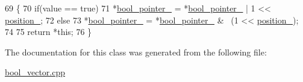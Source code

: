 \begin{DoxyCode}
69                             \{
70                                 \textcolor{keywordflow}{if}(value == \textcolor{keyword}{true})
71                                     *\hyperlink{classVector_3_01bool_01_4_1_1BoolReference_ad9fc66c2a80d7351e5829e321c4d46f0}{bool\_pointer\_} = *\hyperlink{classVector_3_01bool_01_4_1_1BoolReference_ad9fc66c2a80d7351e5829e321c4d46f0}{bool\_pointer\_} | 1 << 
      \hyperlink{classVector_3_01bool_01_4_1_1BoolReference_a88f229e6c448c4e7f34381247eb7f2b8}{position\_};
72                                 \textcolor{keywordflow}{else}
73                                     *\hyperlink{classVector_3_01bool_01_4_1_1BoolReference_ad9fc66c2a80d7351e5829e321c4d46f0}{bool\_pointer\_} = *\hyperlink{classVector_3_01bool_01_4_1_1BoolReference_ad9fc66c2a80d7351e5829e321c4d46f0}{bool\_pointer\_} & ~(1 << 
      \hyperlink{classVector_3_01bool_01_4_1_1BoolReference_a88f229e6c448c4e7f34381247eb7f2b8}{position\_});
74 
75                                 \textcolor{keywordflow}{return} *\textcolor{keyword}{this};
76                             \}
\end{DoxyCode}


The documentation for this class was generated from the following file\+:\begin{DoxyCompactItemize}
\item 
\hyperlink{bool__vector_8cpp}{bool\+\_\+vector.\+cpp}\end{DoxyCompactItemize}
